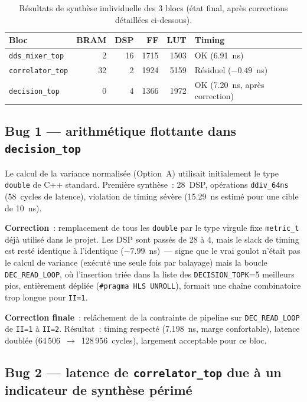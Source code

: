 \documentclass[11pt,a4paper]{article}
\begin{document}
\begin{table}[H]
\centering
\renewcommand{\arraystretch}{1.3}
\begin{tabular}{lrrrrl}
\toprule
\textbf{Bloc} & \textbf{BRAM} & \textbf{DSP} & \textbf{FF} & \textbf{LUT} & \textbf{Timing} \\
\midrule
\texttt{dds\_mixer\_top} & 2 & 16 & 1715 & 1503 & OK (6.91~ns) \\
\texttt{correlator\_top} & 32 & 2 & 1924 & 5159 & Résiduel ($-0.49$~ns) \\
\texttt{decision\_top} & 0 & 4 & 1366 & 1972 & OK (7.20~ns, après correction) \\
\bottomrule
\end{tabular}
\caption{Résultats de synthèse individuelle des 3 blocs (état final, après corrections détaillées ci-dessous).}
\end{table}

\subsection{Bug 1 --- arithmétique flottante dans \texttt{decision\_top}}
\label{sec:bug1-decision}

Le calcul de la variance normalisée (Option~A) utilisait initialement le type \texttt{double} de C++ standard. Première synthèse~: 28~DSP, opérations \texttt{ddiv\_64ns} (58~cycles de latence), violation de timing sévère (15.29~ns estimé pour une cible de 10~ns).

\textbf{Correction}~: remplacement de tous les \texttt{double} par le type virgule fixe \texttt{metric\_t} déjà utilisé dans le projet. Les DSP sont passés de 28 à 4, mais le slack de timing est resté identique à l'identique ($-7.99$~ns)~--- signe que le vrai goulot n'était pas le calcul de variance (exécuté une seule fois par balayage) mais la boucle \texttt{DEC\_READ\_LOOP}, où l'insertion triée dans la liste des \texttt{DECISION\_TOPK}=5 meilleurs pics, entièrement dépliée (\texttt{\#pragma HLS UNROLL}), formait une chaîne combinatoire trop longue pour \texttt{II=1}.

\textbf{Correction finale}~: relâchement de la contrainte de pipeline sur \texttt{DEC\_READ\_LOOP} de \texttt{II=1} à \texttt{II=2}. Résultat~: timing respecté (7.198~ns, marge confortable), latence doublée (64\,506~$\to$~128\,956~cycles), largement acceptable pour ce bloc.

\subsection{Bug 2 --- latence de \texttt{correlator\_top} due à un indicateur de synthèse périmé}
\label{sec:bug2-correlator}
\end{document}
